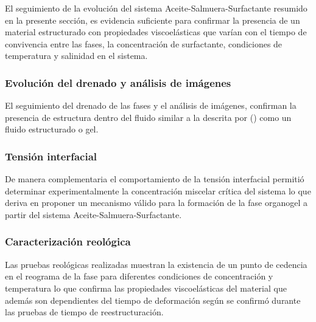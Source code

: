 


El seguimiento de la evolución del sistema Aceite-Salmuera-Surfactante resumido en la presente sección, es evidencia suficiente para confirmar la presencia de un material estructurado con propiedades viscoelásticas que varían con el tiempo de convivencia entre las fases, la concentración de surfactante, condiciones de temperatura y salinidad en el sistema.

\subsubsection{Evolución del drenado y análisis de imágenes}
El seguimiento del drenado de las fases y el análisis de imágenes, confirman la presencia de estructura dentro del fluido similar a la descrita por (\cite{Nishinari2009}) como un fluido estructurado o gel. 

\subsubsection{Tensión interfacial}
De manera complementaria el comportamiento de la tensión interfacial permitió determinar experimentalmente la concentración miscelar crítica del sistema lo que deriva en proponer un mecanismo válido para la formación de la fase organogel a partir del sistema Aceite-Salmuera-Surfactante.

\subsubsection{Caracterización reológica}
Las pruebas reológicas realizadas muestran la existencia de un punto de cedencia en el reograma de la fase para diferentes condiciones de concentración y temperatura lo que confirma las propiedades viscoelásticas del material que además son dependientes del tiempo de deformación según se confirmó durante las pruebas de tiempo de reestructuración.

